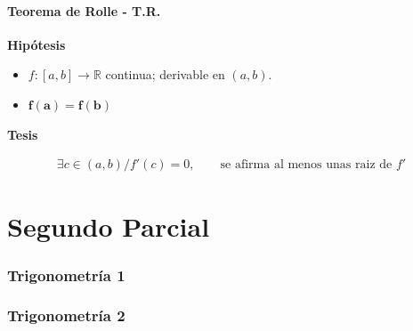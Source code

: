 \documentclass[11pt,titlepage]{article}
\newcommand{\littleTitle}[1]{
	\noindent \ignorespaces
	\small \textbf{#1} \normalsize
	\ignorespaces \ignorespacesafterend
}
\begin{document}
\subsection{Teorema de Rolle - T.R.}
\begin{commBoxy}
	\littleTitle{Hipótesis}\par
	\begin{itemize}
		\item $f: [a,b] \to \mathbb{R}$ continua; derivable en $(a,b)$.
		\item $\boldsymbol{f(a) = f(b)}$
	\end{itemize}
	
	\littleTitle{Tesis}
	\begin{gather}
		\exists c \in (a,b) / f'(c) = 0, \qquad \text{se afirma al menos unas raiz de $f'$}
	\end{gather}
\end{commBoxy}



\newpage
\part{Segundo Parcial}


\appendix
\begin{appendices}
	\section{Trigonometría 1}
	\clearpage
	\section{Trigonometría 2}
	\clearpage
\end{appendices}
\end{document}
